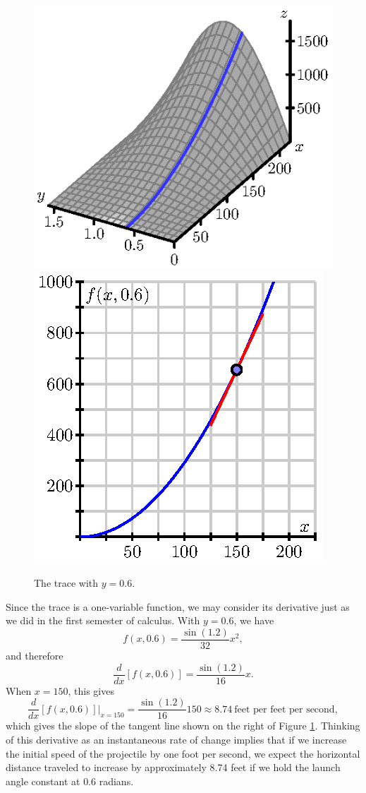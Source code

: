 \begin{figure}[ht]
  \begin{center}
    \includegraphics{figures/fig_10_2_trace_y_a.eps}
    \hspace*{0.5in}
    \includegraphics{figures/fig_10_2_trace_y.eps}
  \end{center}
  \caption{The trace with $y = 0.6$.}
  \label{F:10.2.trace.y}
\end{figure}

Since the trace is a one-variable function, we may consider its
derivative just as we did in the first semester of calculus.  With
$y=0.6$, we have
$$
f(x,0.6) = \frac{\sin(1.2)}{32}x^2,
$$
and therefore
$$
\frac{d}{dx}[f(x,0.6)] = \frac{\sin(1.2)}{16}x.
$$
When $x=150$, this gives
$$
\frac{d}{dx}[f(x,0.6)]|_{x=150} = \frac{\sin(1.2)}{16}150 \approx
8.74~\mbox{feet per feet per second},
$$
which gives the slope of the tangent line shown on the right of Figure 
\ref{F:10.2.trace.y}.  Thinking of this derivative as an instantaneous
rate of change implies that if we increase the initial speed of the projectile by
one foot per second, we expect the horizontal distance traveled to
increase by approximately 8.74 feet if we hold the launch angle constant at $0.6$ radians. 

